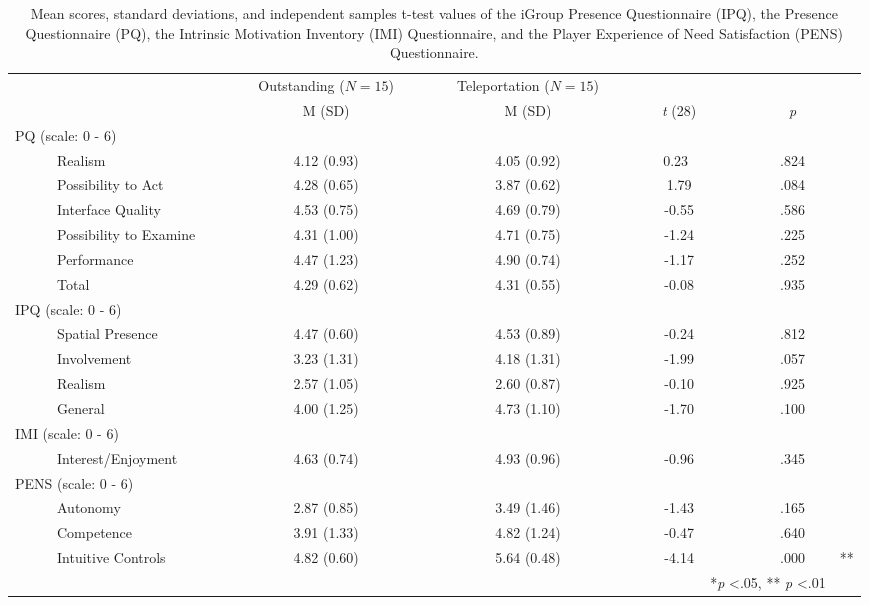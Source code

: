 \documentclass{sigchi}
\begin{document}
\begin{table*}[t]
  \caption{Mean scores, standard deviations, and independent samples t-test values of the iGroup Presence Questionnaire (IPQ), the Presence Questionnaire (PQ), the Intrinsic Motivation Inventory (IMI) Questionnaire, and the Player Experience of Need Satisfaction (PENS) Questionnaire.}
  \label{tab:IPQ}
  \begin{tabular}{lccccl}
    \toprule
     & ~~~~~~~Outstanding ($N = 15$) & ~~~~~~~Teleportation ($N = 15$) \\
     \addlinespace 
      & ~~~~~~~M (SD)	& ~~~~~~~M (SD) & ~~~~~~~\textit{t} (28) & ~~~~~~~\textit{p} & \\
    \midrule
    PQ (scale: 0 - 6)\\
    \ \ \ \ \ \ Realism & ~~~~~~~4.12 (0.93) & ~~~~~~~4.05 (0.92) & ~~~~~~0.23 & ~~~~~~~.824&\\
    \ \ \ \ \ \ Possibility to Act & ~~~~~~~4.28 (0.65) & ~~~~~~~3.87 (0.62) & ~~~~~~~1.79 & ~~~~~~~.084&\\
    \ \ \ \ \ \ Interface Quality & ~~~~~~~4.53 (0.75) & ~~~~~~~4.69 (0.79) & ~~~~~~~-0.55 & ~~~~~~~.586&\\
    \ \ \ \ \ \ Possibility to Examine & ~~~~~~~4.31 (1.00) & ~~~~~~~4.71 (0.75) & ~~~~~~~-1.24 & ~~~~~~~.225&\\
    \ \ \ \ \ \ Performance & ~~~~~~~4.47 (1.23) & ~~~~~~~4.90 (0.74) & ~~~~~~~-1.17 & ~~~~~~~.252&\\
    \ \ \ \ \ \ Total & ~~~~~~~4.29 (0.62) & ~~~~~~~4.31 (0.55) & ~~~~~~~-0.08 & ~~~~~~~.935&\\
    IPQ (scale: 0 - 6)\\
    \ \ \ \ \ \ Spatial Presence & ~~~~~~~4.47 (0.60) & ~~~~~~~4.53 (0.89) & ~~~~~~~-0.24 & ~~~~~~~.812&\\
    \ \ \ \ \ \ Involvement & ~~~~~~~3.23 (1.31) & ~~~~~~~4.18 (1.31) & ~~~~~~~-1.99 & ~~~~~~~.057&\\
    \ \ \ \ \ \ Realism & ~~~~~~~2.57 (1.05) & ~~~~~~~2.60 (0.87) & ~~~~~~~-0.10 & ~~~~~~~.925&\\
    \ \ \ \ \ \ General & ~~~~~~~4.00 (1.25) & ~~~~~~~4.73 (1.10) & ~~~~~~~-1.70 & ~~~~~~~.100&\\
    IMI (scale: 0 - 6)\\
    \ \ \ \ \ \ Interest/Enjoyment & ~~~~~~~4.63 (0.74) & ~~~~~~~4.93 (0.96) & ~~~~~~~-0.96 & ~~~~~~~.345&\\
    PENS (scale: 0 - 6)\\
    \ \ \ \ \ \ Autonomy & ~~~~~~~2.87 (0.85) & ~~~~~~~3.49 (1.46) & ~~~~~~~-1.43 & ~~~~~~~.165&\\
    \ \ \ \ \ \ Competence & ~~~~~~~3.91 (1.33) & ~~~~~~~4.82 (1.24) & ~~~~~~~-0.47 & ~~~~~~~.640&\\
    \ \ \ \ \ \ Intuitive Controls & ~~~~~~~4.82 (0.60) & ~~~~~~~5.64 (0.48) & ~~~~~~~-4.14 & ~~~~~~~.000&**\\
    \bottomrule
     &&&& *\textit{p} <.05, ** \textit{p} <.01\\
\end{tabular}
\end{table*}
\end{document}
